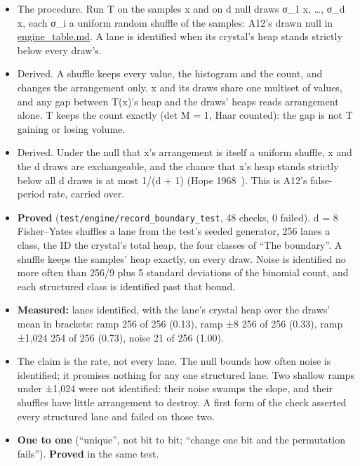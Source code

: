 \begin{itemize}
\begin{itemize}
\item The procedure. Run T on the samples x and on d null draws σ\_\allowbreak{}1 x, …, σ\_\allowbreak{}d x, each σ\_\allowbreak{}i a uniform random shuffle of the samples: A12's drawn null in \hyperref[chap:engine-table]{engine\_\allowbreak{}table.md}. A lane is identified when its crystal's heap stands strictly below every draw's.
\item Derived. A shuffle keeps every value, the histogram and the count, and changes the arrangement only. x and its draws share one multiset of values, and any gap between T(x)'s heap and the draws' heaps reads arrangement alone. T keeps the count exactly (det M = 1, Haar counted): the gap is not T gaining or losing volume.
\item Derived. Under the null that x's arrangement is itself a uniform shuffle, x and the d draws are exchangeable, and the chance that x's heap stands strictly below all d draws is at most 1/(d + 1) (Hope 1968~\cite{src:Hope-1968}). This is A12's false-period rate, carried over.
\item \textbf{Proved} (\texttt{test/\allowbreak{}engine/\allowbreak{}record\_\allowbreak{}boundary\_\allowbreak{}test}, 48 checks, 0 failed). d = 8 Fisher–Yates shuffles a lane from the test's seeded generator, 256 lanes a class, the ID the crystal's total heap, the four classes of “The boundary”. A shuffle keeps the samples' heap exactly, on every draw. Noise is identified no more often than 256/9 plus 5 standard deviations of the binomial count, and each structured class is identified past that bound.
\item \textbf{Measured:} lanes identified, with the lane's crystal heap over the draws' mean in brackets: ramp 256 of 256 (0.13), ramp ±8 256 of 256 (0.33), ramp ±1,024 254 of 256 (0.73), noise 21 of 256 (1.00).
\item The claim is the rate, not every lane. The null bounds how often noise is identified; it promises nothing for any one structured lane. Two shallow ramps under ±1,024 were not identified: their noise swamps the slope, and their shuffles have little arrangement to destroy. A first form of the check asserted every structured lane and failed on those two.
\item \textbf{One to one} (“unique”, not bit to bit; “change one bit and the permutation fails”). \textbf{Proved} in the same test.


\end{itemize}
\end{itemize}
